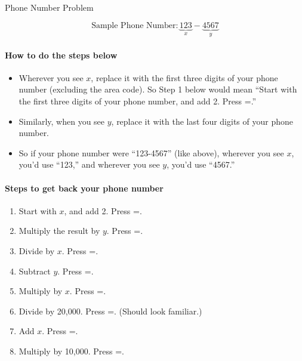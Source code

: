 \documentclass[a4paper,12pt]{scrartcl}
\author{}
\title{}
\date{}
\begin{document}
\begin{center}
    \LARGE
    Phone Number Problem
\end{center}

\[ \text{Sample Phone Number}: \underbrace{123}_{x}-\underbrace{4567}_{y} \]

\paragraph{How to do the steps below}
\begin{itemize}
    \item Wherever you see $x$, replace it with the first three digits of your
	phone number (excluding the area code). So Step 1 below would mean 
	``Start with the first three digits of your phone number, and add 2.
	Press =.''
    \item Similarly, when you see $y$, replace it with the last four digits of your
	phone number.
    \item So if your phone number were ``123-4567'' (like above), 
	wherever you see $x$, you'd use ``123,'' and wherever you
	see $y$, you'd use ``4567.''
\end{itemize}

\paragraph{Steps to get back your phone number}
\begin{enumerate}
    \item Start with $x$, and add 2. Press =.
    \item Multiply the result by $y$. Press =.
    \item Divide by $x$. Press =.
    \item Subtract $y$. Press =.
    \item Multiply by $x$. Press =.
    \item Divide by 20,000. Press =. (Should look familiar.)
    \item Add $x$. Press =.
    \item Multiply by 10,000. Press =.
\end{enumerate}
\end{document}
